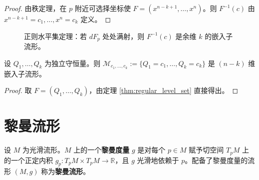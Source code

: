 \begin{proof}
由秩定理，在 $p$ 附近可选择坐标使 $F = (x^{n-k+1}, \dots, x^n)$。则 $F^{-1}(c)$ 由 $x^{n-k+1} = c_1, \dots, x^n = c_k$ 定义。
\end{proof}

\begin{figure}[htbp]
\centering
{}
\caption{正则水平集定理：若 $dF_p$ 处处满射，则 $F^{-1}(c)$ 是余维 $k$ 的嵌入子流形。}
\label{fig:regular_level_set}
\end{figure}

\begin{corollary}[守恒量的水平集]\label{cor:conservation_levelset}
设 $Q_1, \dots, Q_k$ 为独立守恒量。则 $\mathcal{M}_{c_1, \dots, c_k} := \{Q_1 = c_1, \dots, Q_k = c_k\}$ 是 $(n-k)$ 维嵌入子流形。
\end{corollary}

\begin{proof}
取 $F = (Q_1, \dots, Q_k)$，由定理 \ref{thm:regular_level_set} 直接得出。
\end{proof}

\section{黎曼流形}

\begin{definition}[黎曼度量]\label{def:riemannian_metric}
设 $M$ 为光滑流形。$M$ 上的一个\textbf{黎曼度量} $g$ 是对每个 $p \in M$ 赋予切空间 $T_pM$ 上的一个正定内积 $g_p: T_pM \times T_pM \to \mathbb{R}$，且 $g$ 光滑地依赖于 $p$。配备了黎曼度量的流形 $(M, g)$ 称为\textbf{黎曼流形}。
\end{definition}

